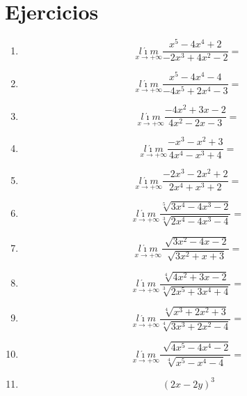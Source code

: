 \documentclass[oneside,spanish,letter]{article}
\begin{document}
\section{Ejercicios}
\begin{enumerate}
 \item $$\underset{x\rightarrow +\infty}{l\acute{\imath}m} \frac{x^5-4x^4+2}{-2x^3+4x^2-2}=$$
 \item $$\underset{x\rightarrow +\infty}{l\acute{\imath}m} \frac{x^5-4x^4-4}{-4x^5+2x^4-3}=$$
 \item $$\underset{x\rightarrow +\infty}{l\acute{\imath}m} \frac{-4x^2+3x-2}{4x^2-2x-3}=$$
 \item $$\underset{x\rightarrow +\infty}{l\acute{\imath}m} \frac{-x^3-x^2+3}{4x^4-x^3+4}=$$
 \item $$\underset{x\rightarrow +\infty}{l\acute{\imath}m} \frac{-2x^3-2x^2+2}{2x^4+x^3+2}=$$
 \item $$\underset{x\rightarrow +\infty}{l\acute{\imath}m} \frac{\sqrt[5]{3x^4-4x^3-2}}{\sqrt[3]{2x^4-4x^3-4}}=$$
 \item $$\underset{x\rightarrow +\infty}{l\acute{\imath}m} \frac{\sqrt[]{3x^2-4x-2}}{\sqrt[]{3x^2+x+3}}=$$
 \item $$\underset{x\rightarrow +\infty}{l\acute{\imath}m} \frac{\sqrt[4]{4x^2+3x-2}}{\sqrt[3]{2x^5+3x^4+4}}=$$
 \item $$\underset{x\rightarrow +\infty}{l\acute{\imath}m} \frac{\sqrt[4]{x^3+2x^2+3}}{\sqrt[4]{3x^3+2x^2-4}}=$$
 \item $$\underset{x\rightarrow +\infty}{l\acute{\imath}m} \frac{\sqrt[]{4x^5-4x^4-2}}{\sqrt[4]{x^5-x^4-4}}=$$
\item $$(2x-2y)^3$$
 \end{enumerate}
  \newpage
\end{document}
